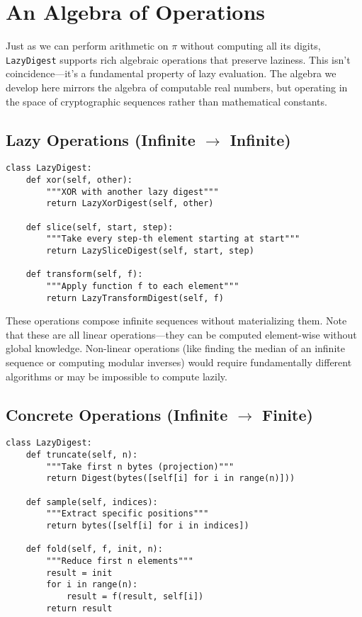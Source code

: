 \documentclass[11pt]{article}
\begin{document}
\section{An Algebra of Operations}

Just as we can perform arithmetic on $\pi$ without computing all its digits, \texttt{LazyDigest} supports rich algebraic operations that preserve laziness. This isn't coincidence---it's a fundamental property of lazy evaluation. The algebra we develop here mirrors the algebra of computable real numbers, but operating in the space of cryptographic sequences rather than mathematical constants.

\subsection{Lazy Operations (Infinite $\to$ Infinite)}

\begin{lstlisting}
class LazyDigest:
    def xor(self, other):
        """XOR with another lazy digest"""
        return LazyXorDigest(self, other)
    
    def slice(self, start, step):
        """Take every step-th element starting at start"""
        return LazySliceDigest(self, start, step)
    
    def transform(self, f):
        """Apply function f to each element"""
        return LazyTransformDigest(self, f)
\end{lstlisting}

These operations compose infinite sequences without materializing them. Note that these are all linear operations---they can be computed element-wise without global knowledge. Non-linear operations (like finding the median of an infinite sequence or computing modular inverses) would require fundamentally different algorithms or may be impossible to compute lazily.

\subsection{Concrete Operations (Infinite $\to$ Finite)}

\begin{lstlisting}
class LazyDigest:
    def truncate(self, n):
        """Take first n bytes (projection)"""
        return Digest(bytes([self[i] for i in range(n)]))
    
    def sample(self, indices):
        """Extract specific positions"""
        return bytes([self[i] for i in indices])
    
    def fold(self, f, init, n):
        """Reduce first n elements"""
        result = init
        for i in range(n):
            result = f(result, self[i])
        return result
\end{lstlisting}
\end{document}
